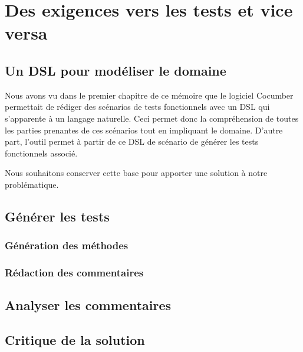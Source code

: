 \chapter{Des exigences vers les tests et vice versa}
\label{chap:secondchapitre}

\section{Un DSL pour modéliser le domaine}

Nous avons vu dans le premier chapitre de ce mémoire que le logiciel Cocumber permettait de rédiger des scénarios de tests fonctionnels avec un DSL qui s'apparente à un langage naturelle. Ceci permet donc la compréhension de toutes les parties prenantes de ces scénarios tout en impliquant le domaine. D'autre part, l'outil permet à partir de ce DSL de scénario de générer les tests fonctionnels associé.

Nous souhaitons conserver cette base pour apporter une solution à notre problématique.  

\section{Générer les tests}

\subsection{Génération des méthodes}
\subsection{Rédaction des commentaires}

\section{Analyser les commentaires}

\section{Critique de la solution}